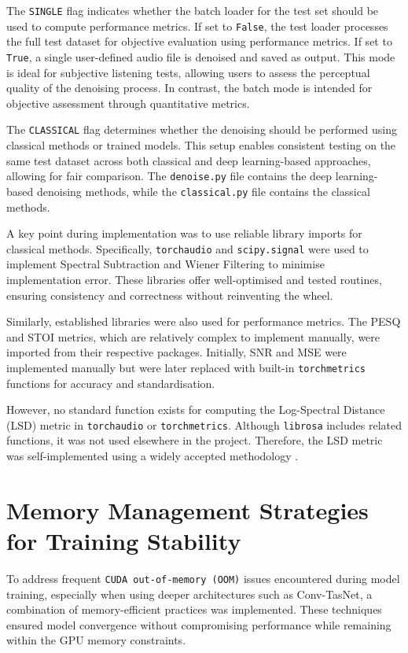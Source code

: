 The \texttt{SINGLE} flag indicates whether the batch loader for the test set should be used to compute performance metrics. If set to \texttt{False}, the test loader processes the full test dataset for objective evaluation using performance metrics. If set to \texttt{True}, a single user-defined audio file is denoised and saved as output. This mode is ideal for subjective listening tests, allowing users to assess the perceptual quality of the denoising process. In contrast, the batch mode is intended for objective assessment through quantitative metrics.

The \texttt{CLASSICAL} flag determines whether the denoising should be performed using classical methods or trained models. This setup enables consistent testing on the same test dataset across both classical and deep learning-based approaches, allowing for fair comparison. The \texttt{denoise.py} file contains the deep learning-based denoising methods, while the \texttt{classical.py} file contains the classical methods.

A key point during implementation was to use reliable library imports for classical methods. Specifically, \texttt{torchaudio} and \texttt{scipy.signal} were used to implement Spectral Subtraction and Wiener Filtering to minimise implementation error. These libraries offer well-optimised and tested routines, ensuring consistency and correctness without reinventing the wheel.

Similarly, established libraries were also used for performance metrics. The PESQ and STOI metrics, which are relatively complex to implement manually, were imported from their respective packages. Initially, SNR and MSE were implemented manually but were later replaced with built-in \texttt{torchmetrics} functions for accuracy and standardisation.

However, no standard function exists for computing the Log-Spectral Distance (LSD) metric in \texttt{torchaudio} or \texttt{torchmetrics}. Although \texttt{librosa} includes related functions, it was not used elsewhere in the project. Therefore, the LSD metric was self-implemented using a widely accepted methodology \cite{enwiki_lsd}.


\section{Memory Management Strategies for Training Stability}

To address frequent \texttt{CUDA out-of-memory (OOM)} issues encountered during model training, especially when using deeper architectures such as Conv-TasNet, a combination of memory-efficient practices was implemented. These techniques ensured model convergence without compromising performance while remaining within the GPU memory constraints.

